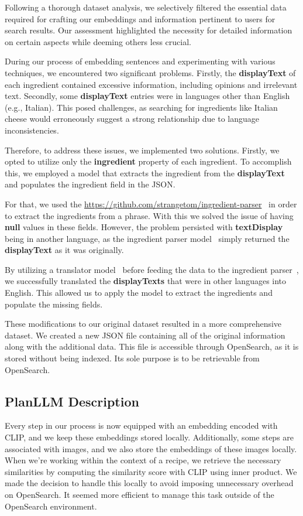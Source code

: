 \documentclass[runningheads]{llncs}
\begin{document}
Following a thorough dataset analysis, we selectively filtered the essential data required for crafting our embeddings and information pertinent to users for search results. Our assessment highlighted the necessity for detailed information on certain aspects while deeming others less crucial.

During our process of embedding sentences and experimenting with various techniques, we encountered two significant problems. Firstly, the \textbf{displayText} of each ingredient contained excessive information, including opinions and irrelevant text. Secondly, some \textbf{displayText} entries were in languages other than English (e.g., Italian). This posed challenges, as searching for ingredients like Italian cheese would erroneously suggest a strong relationship due to language inconsistencies.

Therefore, to address these issues, we implemented two solutions. Firstly, we opted to utilize only the \textbf{ingredient} property of each ingredient. To accomplish this, we employed a model that extracts the ingredient from the \textbf{displayText} and populates the ingredient field in the JSON.

For that, we used the \url{https://github.com/strangetom/ingredient-parser}~\cite{ingredientParser} in order to extract the ingredients from a phrase. With this we solved the issue of having \textbf{null} values in these fields. However, the problem persisted with \textbf{textDisplay} being in another language, as the ingredient parser model~\cite{ingredientParser} simply returned the \textbf{displayText} as it was originally.

By utilizing a translator model~\cite{deeptranslate} before feeding the data to the ingredient parser~\cite{ingredientParser}, we successfully translated the \textbf{displayTexts} that were in other languages into English. This allowed us to apply the model to extract the ingredients and populate the missing fields.

These modifications to our original dataset resulted in a more comprehensive dataset. We created a new JSON file containing all of the original information along with the additional data. This file is accessible through OpenSearch, as it is stored without being indexed. Its sole purpose is to be retrievable from OpenSearch.

\subsection{PlanLLM Description}
Every step in our process is now equipped with an embedding encoded with CLIP, and we keep these embeddings stored locally. Additionally, some steps are associated with images, and we also store the embeddings of these images locally. When we're working within the context of a recipe, we retrieve the necessary similarities by computing the similarity score with CLIP using inner product. We made the decision to handle this locally to avoid imposing unnecessary overhead on OpenSearch. It seemed more efficient to manage this task outside of the OpenSearch environment.
\end{document}
